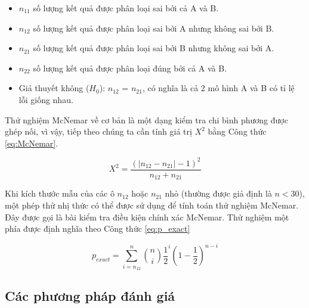 \documentclass[../the.tex]{subfiles}
\begin{document}
\begin {itemize}
\item $n_{11}$ số lượng kết quả được phân loại sai bởi cả A và B.
\item $n_{12}$ số lượng kết quả được phân loại sai bởi A nhưng không sai bởi B.
\item $n_{21}$ số lượng kết quả được phân loại sai bởi B nhưng không sai bởi A.
\item $n_{22}$ số lượng kết quả được phân loại đúng bởi cả A và B.
\item Giả thuyết không ($H_0$): $n_{12}$ = $n_{21}$, có nghĩa là cả 2 mô hình A và B có tỉ lệ lỗi giống nhau.
\end {itemize}

Thử nghiệm McNemar về cơ bản là một dạng kiểm tra chi bình phương được ghép nối, vì vậy, tiếp theo chúng ta cần tính giá trị $X^2$ bằng Công thức \ref{eq:McNemar}.

\begin{equation}
	X^2 = \frac{(|n_{12} - n_{21}| - 1)^2}{n_{12} + n_{21}}
	\label{eq:McNemar}
\end{equation}

Khi kích thước mẫu của các ô $n_{12}$ hoặc $n_{21}$ nhỏ (thường được giả định là $n < 30$), một phép thử nhị thức có thể được sử dụng để tính toán thử nghiệm McNemar. Đây được gọi là bài kiểm tra điều kiện chính xác McNemar. Thử nghiệm một phía được định nghĩa theo Công thức \ref{eq:p_exact}

\begin{equation}
	p_{exact} = \sum_{i=n_{12}}^{n} \binom{n}{i} \frac{1}{2}^i (1 - \frac{1}{2})^{n-i}
	\label{eq:p_exact}
\end{equation}

\subsection{Các phương pháp đánh giá}
\end{document}
